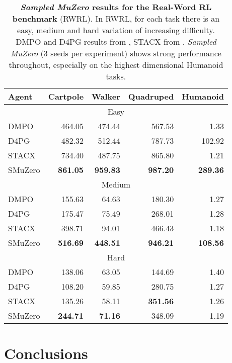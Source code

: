 \documentclass{article}
\newcommand{\smuzero}{\emph{Sampled MuZero}}
\begin{document}
\begin{table}[t]
\begin{tabularx}{\columnwidth}{l rrrr}

\toprule
Agent & Cartpole & Walker & Quadruped & Humanoid \\\midrule
\multicolumn{5}{c}{Easy} \\
DMPO & 464.05 & 474.44 & 567.53 & 1.33\\
D4PG & 482.32 & 512.44 & 787.73 & 102.92\\
STACX & 734.40 & 487.75 & 865.80 & 1.21\\
SMuZero & \textbf{861.05} & \textbf{959.83} & \textbf{987.20} & \textbf{289.36}\\
\midrule
\multicolumn{5}{c}{Medium} \\
DMPO & 155.63 & 64.63 & 180.30 & 1.27\\
D4PG & 175.47 & 75.49 & 268.01 & 1.28\\
STACX & 398.71 & 94.01 & 466.43 & 1.18\\
SMuZero & \textbf{516.69} & \textbf{448.51} & \textbf{946.21} & \textbf{108.56}\\
\midrule
\multicolumn{5}{c}{Hard} \\
DMPO & 138.06 & 63.05 & 144.69 & 1.40\\
D4PG & 108.20 & 59.85 & 280.75 & 1.27\\
STACX & 135.26 & 58.11 & \textbf{351.56} & 1.26\\
SMuZero & \textbf{244.71} & \textbf{71.16} & 348.09 & 1.19\\
\bottomrule
\end{tabularx}
 
\caption{
\label{tab:rwrl-results}
\textbf{\smuzero{} results for the Real-Word RL benchmark} (RWRL). In RWRL, for each task there is an easy, medium and hard variation of increasing difficulty. DMPO and D4PG results from \cite{dulacarnold2020empirical}, STACX from \cite{zahavy2020stacx}. \smuzero{} (3 seeds per experiment) shows strong performance throughout, especially on the highest dimensional Humanoid tasks.
}
\end{table}

\section{Conclusions}
\end{document}
